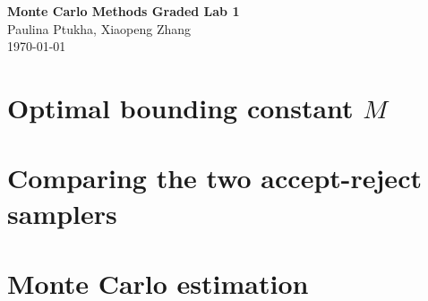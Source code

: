 \documentclass[twocolumn, 10pt]{article}
\begin{document}
    {\centering
    \Large\textbf{Monte Carlo Methods Graded Lab 1}\\[0.5em]
    \normalsize Paulina Ptukha, Xiaopeng Zhang\\[0.3em]
    \today\\[1em]
    }

    \section{Optimal bounding constant \(M\)}
    
    \section{Comparing the two accept-reject samplers}
    
    \section{Monte Carlo estimation}
    
\end{document}
